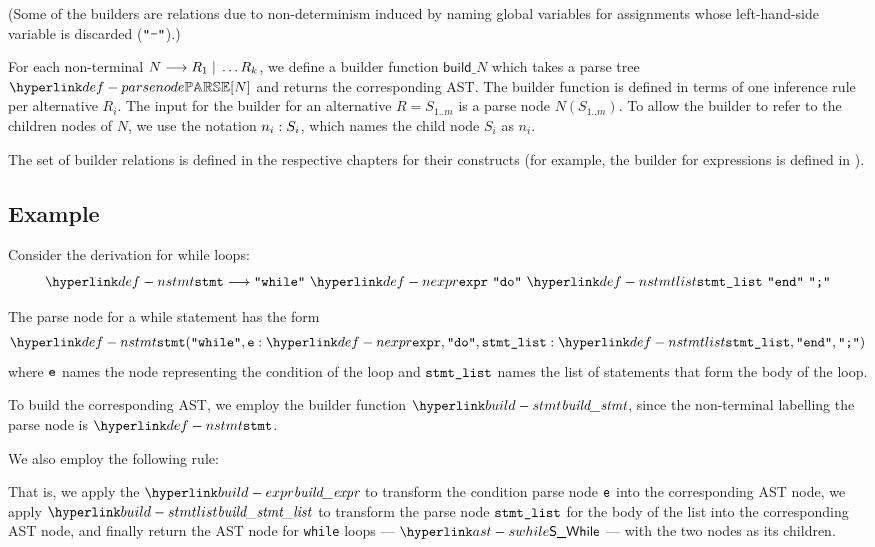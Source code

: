 (Some of the builders are relations due to non-determinism induced by naming global variables
for assignments whose left-hand-side variable is discarded ($\Tminus$).)

For each non-terminal $N \derives R_1 \;|\; \ldots R_k$, we define a builder function
$\textsf{build\_}N $ which takes a parse tree $\parsenode{N}$ and returns the corresponding
AST. The builder function is defined in terms of one inference rule per alternative $R_i$.
The input for the builder for an alternative $R = S_{1..m}$ is a parse node
$N(S_{1..m})$. To allow the builder to refer to the children nodes of $N$,
we use the notation $\namednode{n_i}{S_i}$, which names the child node $S_i$ as $n_i$.

The set of builder relations is defined in the respective chapters for their constructs
(for example, the builder for expressions is defined in ).

\subsection{Example}
Consider the derivation for while loops:
\[
\Nstmt \derives \Twhile \parsesep \Nexpr \parsesep \Tdo \parsesep \Nstmtlist \parsesep \Tend \parsesep \Tsemicolon
\]

The parse node for a while statement has the form
\[
\Nstmt(\Twhile, \namednode{\ve}{\Nexpr}, \Tdo, \namednode{\vstmtlist}{\Nstmtlist}, \Tend, \Tsemicolon)
\]
where $\ve$ names the node representing the condition of the loop and $\vstmtlist$ names
the list of statements that form the body of the loop.

To build the corresponding AST, we employ the builder function $\buildstmt$, since
the non-terminal labelling the parse node is $\Nstmt$.

We also employ the following rule:
\begin{mathpar}
\end{mathpar}
That is, we apply the $\buildexpr$ to transform the condition parse node $\ve$ into the corresponding AST node,
we apply $\buildstmtlist$ to transform the parse node $\vstmtlist$ for the body of the list into the corresponding AST node,
and finally return the AST node for \texttt{while} loops --- $\SWhile$ --- with the two nodes as its children.

